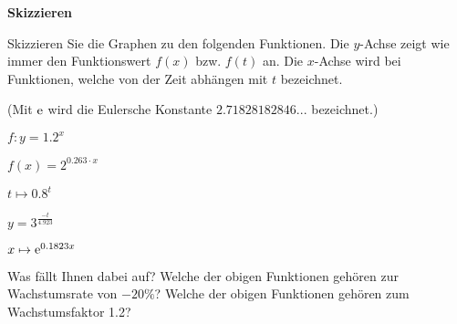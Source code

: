 \platzFuerBerechnungenBisEndeSeite{}



\bbwActAufgabenNr{} \textbf{Skizzieren}

Skizzieren Sie die Graphen zu den folgenden Funktionen. Die $y$-Achse
zeigt wie immer den Funktionswert $f(x)$ bzw. $f(t)$ an. Die $x$-Achse
wird bei Funktionen, welche von der Zeit abhängen mit $t$ bezeichnet.

(Mit $\operatorname{\mathrm{e}}$ wird die Eulersche Konstante $2.71828182846...$ bezeichnet.)
\begin{bbwAufgabenBlock}
\item $f: y=1.2^x$
\item $f(x) = 2^{0.263\cdot{}x}$
\item $t\mapsto{} 0.8^t$
\item $y=3^{\frac{-t}{4.923}}$
\item $x\mapsto \operatorname{\mathrm{e}}^{0.1823x}$
\end{bbwAufgabenBlock}

Was fällt Ihnen dabei auf? Welche der obigen Funktionen gehören zur
Wachstumsrate von $-20\%$? Welche der obigen Funktionen gehören zum
Wachstumsfaktor 1.2?

\platzFuerBerechnungenBisEndeSeite{}



\newpage
